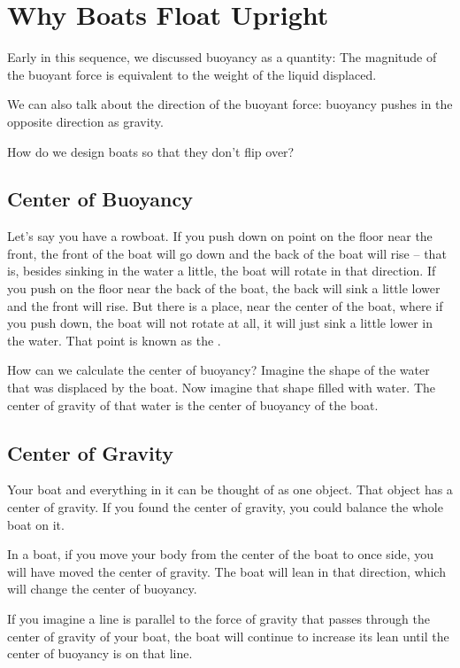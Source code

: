 \section{Why Boats Float Upright}

Early in this sequence, we discussed buoyancy as a quantity: The magnitude of the buoyant force is equivalent to the weight of the liquid displaced.

We can also talk about the direction of the buoyant force: buoyancy pushes in the opposite direction as gravity.

How do we design boats so that they don't flip over?

\subsection{Center of Buoyancy}

Let's say you have a rowboat.   If you push down on point on the floor near the front,  the front of the boat will go down and the back of the boat will rise -- 
that is, besides sinking in the water a little,  the boat will rotate in that direction.   If you push on the floor near the back of the boat,  the back will sink a little lower and the front will rise.  But there is a place, near the center of the boat, where if you push down,  the boat will not rotate at all,  it will just sink a little lower
in the water.    That point is known as the .

How can we calculate the center of buoyancy?  Imagine the shape of the water that was displaced by the boat.   Now imagine that shape filled with water.   The center of gravity of that water is the center of buoyancy of the boat.

\subsection{Center of Gravity}

Your boat and everything in it can be thought of as one object.  That object has a center of gravity.    If you found the center of gravity,  you could balance the whole boat on it.

In a boat,  if you move your body from the center of the boat to once side,   you will have moved the center of gravity.    The boat will lean in that direction,   which will change the center of buoyancy. 

If you imagine a line is parallel to the force of gravity that passes through the center of gravity of your boat,   the boat will continue to increase its lean until
the center of buoyancy is on that line.  

